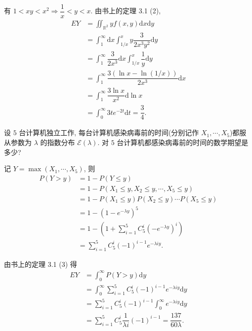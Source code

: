 \documentclass{ctexart}
\begin{document}
\begin{solution}
    有 $1<xy<x^2\Rightarrow\dfrac{1}{x}<y<x$. 由书上的定理 3.1 (2),
    \begin{align*}
        EY & =\iint_{\mathbb{R}^2}yf(x,y)\mathrm{d}x\mathrm{d}y \\
        & =\int_1^\infty\mathrm{d}x\int_{1/x}^xy\dfrac{3}{2x^3y^2}\mathrm{d}y \\
        & =\int_1^\infty\dfrac{3}{2x^3}\mathrm{d}x\int_{1/x}^x\dfrac{1}{y}\mathrm{d}y \\
        & =\int_1^\infty\dfrac{3(\ln x-\ln (1/x))}{2x^3}\mathrm{d}x \\
        & =\int_1^\infty\dfrac{3\ln x}{x^2}\mathrm{d}\ln x \\
        & =\int_0^\infty3te^{-2t}\mathrm{d}t=\dfrac{3}{4}.
    \end{align*}
\end{solution}
\addtocounter{exercise}{2}
\begin{exercise}[b]%
    设 $5$ 台计算机独立工作, 每台计算机感染病毒前的时间(分别记作 $X_1,\cdots,X_5$)都服从参数为 $\lambda$ 的指数分布 $\mathcal{E}(\lambda)$. 对 $5$ 台计算机都感染病毒前的时间的数学期望是多少?
\end{exercise}
\begin{solution}
    记 $Y=\max(X_1,\cdots,X_5)$, 则
    \begin{align*}
        P(Y>y) & =1-P(Y\leq y) \\
        & =1-P(X_1\leq y,X_2\leq y,\cdots,X_5\leq y) \\
        & =1-P(X_1\leq y)P(X_2\leq y)\cdots P(X_5\leq y) \\
        & =1-(1-e^{-\lambda y})^5 \\
        & =1-\left(1+\sum\limits_{i=1}^5C_5^i(-e^{-\lambda y})^i\right) \\
        & =\sum\limits_{i=1}^5C_5^i(-1)^{i-1}e^{-\lambda iy}.
    \end{align*}

    由书上的定理 3.1 (3) 得
    \begin{align*}
        EY & =\int_0^\infty P(Y>y)\mathrm{d}y \\
        & =\int_0^\infty\sum\limits_{i=1}^5C_5^i(-1)^{i-1}e^{-\lambda iy}\mathrm{d}y \\
        & =\sum\limits_{i=1}^5C_5^i(-1)^{i-1}\int_0^\infty e^{-\lambda iy}\mathrm{d}y \\
        & =\sum\limits_{i=1}^5C_5^i\dfrac{1}{\lambda i}(-1)^{i-1}=\dfrac{137}{60\lambda}.
    \end{align*}
\end{solution}
\end{document}
